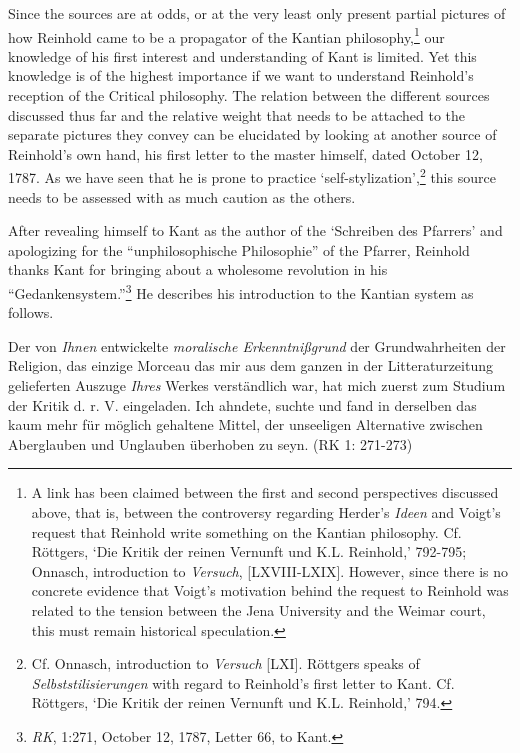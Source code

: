 Since the sources are at odds, or at the very least only present partial pictures of how Reinhold came to be a propagator of the Kantian philosophy,\footnote{ A link has been claimed between the first and second perspectives discussed above, that is, between the controversy regarding Herder's \textit{Ideen} and Voigt's request that Reinhold write something on the Kantian philosophy. Cf. R\"{o}ttgers, `Die Kritik der reinen Vernunft und K.L. Reinhold,' 792{-}795; Onnasch, introduction to \textit{Versuch}, [LXVIII{-}LXIX]. However, since there is no concrete evidence that Voigt's motivation behind the request to Reinhold was related to the tension between the Jena University and the Weimar court, this must remain historical speculation. } our knowledge of his first interest and understanding of Kant is limited. Yet this knowledge is of the highest importance if we want to understand Reinhold's reception of the Critical philosophy. The relation between the different sources discussed thus far and the relative weight that needs to be attached to the separate pictures they convey can be elucidated by looking at another source of Reinhold's own hand, his first letter to the master himself, dated October 12, 1787. As we have seen that he is prone to practice `self{-}stylization',\footnote{ Cf. Onnasch, introduction to \textit{Versuch }[LXI]. R\"{o}ttgers speaks of \textit{Selbststilisierungen }with regard to Reinhold's first letter to Kant. Cf. R\"{o}ttgers, `Die Kritik der reinen Vernunft und K.L. Reinhold,' 794.} this source needs to be assessed with as much caution as the others. 

After revealing himself to Kant as the author of the `Schreiben des Pfarrers' and apologizing for the ``unphilosophische Philosophie'' of the Pfarrer, Reinhold thanks Kant for bringing about a wholesome revolution in his ``Gedankensystem.''\footnote{ \textit{RK}, 1:271, October 12, 1787, Letter 66, to Kant. } He describes his introduction to the Kantian system as follows. 

Der von \textit{Ihnen }entwickelte \textit{moralische Erkenntni\ss{}grund} der Grundwahrheiten der Religion, das einzige Morceau das mir aus dem ganzen in der Litteraturzeitung gelieferten Auszuge \textit{Ihres} Werkes verst\"{a}ndlich war, hat mich zuerst zum Studium der Kritik d. r. V. eingeladen. Ich ahndete, suchte und fand in derselben das kaum mehr f\"{u}r m\"{o}glich gehaltene Mittel, der unseeligen Alternative zwischen Aberglauben und Unglauben \"{u}berhoben zu seyn. (RK 1: 271{-}273)

